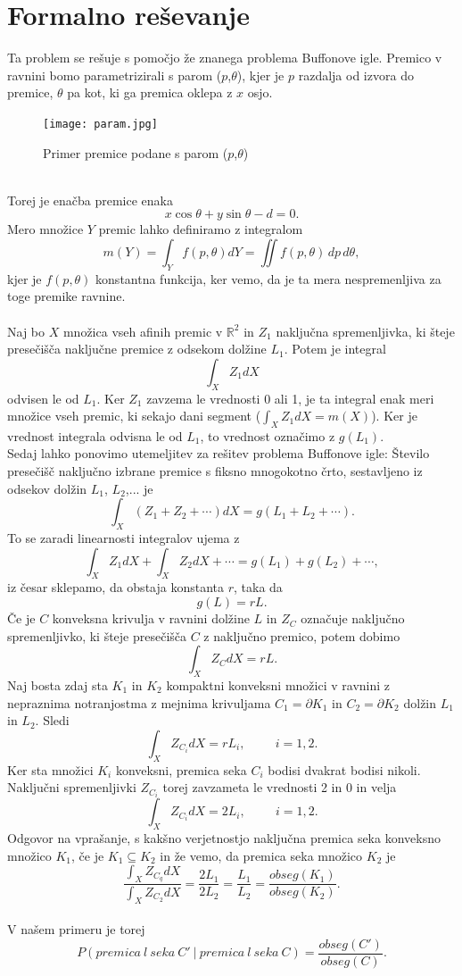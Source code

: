 \documentclass[a4paper,12pt]{article}
\begin{document}
\section{Formalno reševanje}
Ta problem se rešuje s pomočjo že znanega problema Buffonove igle. Premico v ravnini bomo parametrizirali s parom ($p$,$\theta$), kjer je $p$ razdalja od izvora do premice, $\theta$ pa kot, ki ga premica oklepa z $x$ osjo. 
\begin{figure}[h!]
	\begin{center}
		\texttt{[image: param.jpg]}
            \caption{Primer premice podane s parom ($p$,$\theta$)}
	\end{center}
\end{figure}
\\
Torej je enačba premice enaka $$x\cos{\theta}+y\sin{\theta}-d=0.$$
Mero množice $Y$ premic lahko definiramo z integralom $$m(Y)=\int_{Y} f(p,\theta) dY=\iint f(p,\theta)\,dp\,d\theta,$$kjer je $f(p,\theta)$ konstantna funkcija, ker vemo, da je ta mera nespremenljiva za toge premike ravnine.\\
\\
Naj bo $X$ množica vseh afinih premic v $\mathbb{R}^2$ in $Z_1$ naključna spremenljivka, ki šteje presečišča naključne premice z odsekom dolžine $L_1$. Potem je integral $$\int_{X} Z_1 dX $$ odvisen le od $L_1$. Ker $Z_1$ zavzema le vrednosti 0 ali 1, je ta integral enak meri množice vseh
premic, ki sekajo dani segment ($\int_{X} Z_1 dX=m(X)$). Ker je vrednost integrala odvisna le od $L_1$, to vrednost označimo z $g(L_1).$ \\
Sedaj lahko ponovimo utemeljitev za rešitev problema Buffonove igle: Število presečišč naključno izbrane premice s fiksno mnogokotno črto, sestavljeno iz odsekov dolžin $L_1$, $L_2$,... je
$$\int_{X} (Z_1+Z_2+\cdots) dX=g(L_1+L_2+\cdots).$$
To se zaradi linearnosti integralov ujema z 
$$\int_{X} Z_1 dX + \int_{X} Z_2 dX+\cdots=g(L_1)+g(L_2)+\cdots,$$
iz česar sklepamo, da obstaja konstanta $r$, taka da $$g(L)=rL.$$
Če je $C$ konveksna krivulja v ravnini dolžine $L$ in $Z_C$ označuje naključno spremenljivko, ki šteje presečišča $C$ z naključno premico, potem dobimo $$\int_{X} Z_C dX=rL.$$
Naj bosta zdaj sta $K_1$ in $K_2$ kompaktni konveksni množici v ravnini z nepraznima notranjostma z mejnima krivuljama $C_1 =\partial K_1$ in $C_2 =\partial K_2$ dolžin $L_1$ in $L_2$. Sledi $$\int_{X} Z_{C_i} dX=rL_i,\hspace{1cm} i=1,2.$$
Ker sta množici $K_i$ konveksni, premica seka $C_i$ bodisi dvakrat bodisi nikoli. Naključni spremenljivki $Z_{C_i}$ torej zavzameta le vrednosti 2 in 0 in velja  $$\int_{X} Z_{C_i} dX=2L_i,\hspace{1cm} i=1,2.$$
Odgovor na vprašanje, s kakšno verjetnostjo naključna premica seka konveksno množico $K_1$, če je $K_1 \subseteq K_2$ in že vemo, da premica seka množico $K_2$ je $$\frac{\int_{X} Z_{C_q} dX}{\int_{X} Z_{C_2} dX}=\frac{2L_1}{2L_2}=\frac{L_1}{L_2}=\frac{obseg(K_1)}{obseg(K_2)}.$$
\\
V našem primeru je torej 
$$P(premica\ l\ seka\ C'\ |\ premica\ l\ seka\ C)=\frac{obseg(C')}{obseg(C)}.$$
\end{document}
